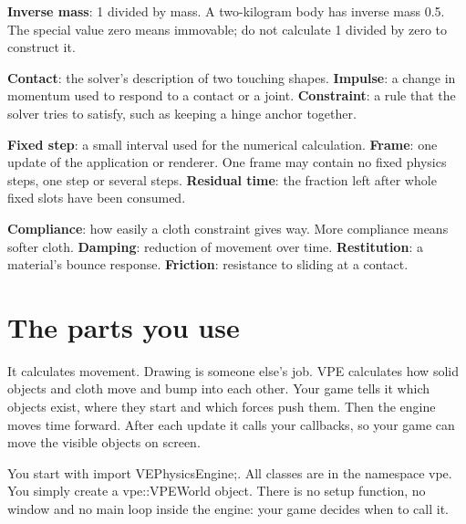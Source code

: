 \documentclass[11pt,a4paper]{article}
\begin{document}
\textbf{Inverse mass}: 1 divided by mass. A two-kilogram body has inverse mass 0.5. The special value zero means immovable; do not calculate 1 divided by zero to construct it.

\textbf{Contact}: the solver's description of two touching shapes. \textbf{Impulse}: a change in momentum used to respond to a contact or a joint. \textbf{Constraint}: a rule that the solver tries to satisfy, such as keeping a hinge anchor together.

\textbf{Fixed step}: a small interval used for the numerical calculation. \textbf{Frame}: one update of the application or renderer. One frame may contain no fixed physics steps, one step or several steps. \textbf{Residual time}: the fraction left after whole fixed slots have been consumed.

\textbf{Compliance}: how easily a cloth constraint gives way. More compliance means softer cloth. \textbf{Damping}: reduction of movement over time. \textbf{Restitution}: a material's bounce response. \textbf{Friction}: resistance to sliding at a contact.
\clearpage\part{The parts you use}
\label{vpe-core-1}
It calculates movement. Drawing is someone else's job. VPE calculates how solid objects and cloth move and bump into each other. Your game tells it which objects exist, where they start and which forces push them. Then the engine moves time forward. After each update it calls your callbacks, so your game can move the visible objects on screen.

\begin{center}\end{center}

You start with import VEPhysicsEngine;. All classes are in the namespace vpe. You simply create a vpe::VPEWorld object. There is no setup function, no window and no main loop inside the engine: your game decides when to call it.
\end{document}
